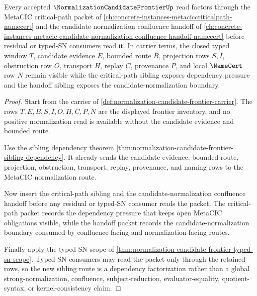 \begin{theorem}
\label{thm:normalization-candidate-frontier-metacic-sibling-route}
Every accepted $\NormalizationCandidateFrontierUp$ read factors through the MetaCIC critical-path packet of \autoref{ch:concrete-instances-metaciccriticalpath-namecert} and the candidate-normalization confluence handoff of \autoref{ch:concrete-instances-metacic-candidate-normalization-confluence-handoff-namecert} before residual or typed-SN consumers read it. In carrier terms, the closed typed window $T$, candidate evidence $E$, bounded route $B$, projection rows $S,I$, obstruction row $O$, transport $H$, replay $C$, provenance $P$, and local $\NameCert$ row $N$ remain visible while the critical-path sibling exposes dependency pressure and the handoff sibling exposes the candidate-normalization boundary.
\end{theorem}
\begin{proof}
Start from the carrier of \autoref{def:normalization-candidate-frontier-carrier}. The rows $T,E,B,S,I,O,H,C,P,N$ are the displayed frontier inventory, and no positive normalization read is available without the candidate evidence and bounded route.

Use the sibling dependency theorem \autoref{thm:normalization-candidate-frontier-sibling-dependency}. It already sends the candidate-evidence, bounded-route, projection, obstruction, transport, replay, provenance, and naming rows to the MetaCIC normalization route.

Now insert the critical-path sibling and the candidate-normalization confluence handoff before any residual or typed-SN consumer reads the packet. The critical-path packet records the dependency pressure that keeps open MetaCIC obligations visible, while the handoff packet records the candidate-normalization boundary consumed by confluence-facing and normalization-facing routes.

Finally apply the typed SN scope of \autoref{thm:normalization-candidate-frontier-typed-sn-scope}. Typed-SN consumers may read the packet only through the retained rows, so the new sibling route is a dependency factorization rather than a global strong-normalization, confluence, subject-reduction, evaluator-equality, quotient-syntax, or kernel-consistency claim.
\end{proof}
